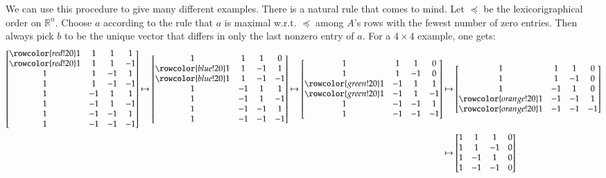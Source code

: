\documentclass[12pt]{article}
\theoremstyle{definitionstyle}
\def\mbb#1{\mathbb{#1}}
\def\R{\mbb{R}}
\begin{document}
We can use this procedure to give many different examples. There is a natural rule that comes to mind. Let $\preceq$ be the lexicorigraphical order on $\R^n$. Choose $a$ according to the rule that $a$ is maximal w.r.t. $\preceq$ among $A$'s rows with the fewest number of zero entries. Then always pick $b$ to be the unique vector that differs in only the last nonzero entry of $a$. For a $4 \times 4$ example, one gets:
\begin{align*}
    \begin{bmatrix}
        \rowcolor{red!20} 1 & 1 & 1 & 1 \\
        \rowcolor{red!20} 1 & 1 & 1 & -1 \\
         1 & 1 & -1 & 1 \\
         1 & 1 & -1 & -1 \\
         1 & -1 & 1 & 1 \\
         1 & -1 & 1 & -1 \\
         1 & -1 & -1 & 1 \\
         1 & -1 & -1 & -1
    \end{bmatrix} \mapsto 
    \begin{bmatrix}
        1 & 1 & 1 & 0 \\
        \rowcolor{blue!20} 1 & 1 & -1 & 1 \\
        \rowcolor{blue!20} 1 & 1 & -1 & -1 \\
        1 & -1 & 1 & 1 \\
        1 & -1 & 1 & -1 \\
        1 & -1 & -1 & 1 \\
        1 & -1 & -1 & -1
    \end{bmatrix} \mapsto 
    \begin{bmatrix}
        1 & 1 & 1 & 0 \\
        1 & 1 & -1 & 0 \\
        \rowcolor{green!20} 1 & -1 & 1 & 1 \\
        \rowcolor{green!20} 1 & -1 & 1 & -1 \\
        1 & -1 & -1 & 1 \\
        1 & -1 & -1 & -1
    \end{bmatrix} &\mapsto
    \begin{bmatrix}
        1 & 1 & 1 & 0 \\
        1 & 1 & -1 & 0 \\
        1 & -1 & 1 & 0 \\
        \rowcolor{orange!20} 1 & -1 & -1 & 1 \\
        \rowcolor{orange!20} 1 & -1 & -1 & -1
    \end{bmatrix} \\
    &\mapsto 
    \begin{bmatrix}
        1 & 1 & 1 & 0 \\
        1 & 1 & -1 & 0 \\
        1 & -1 & 1 & 0 \\
        1 & -1 & -1 & 0
    \end{bmatrix}
\end{align*}
\end{document}
